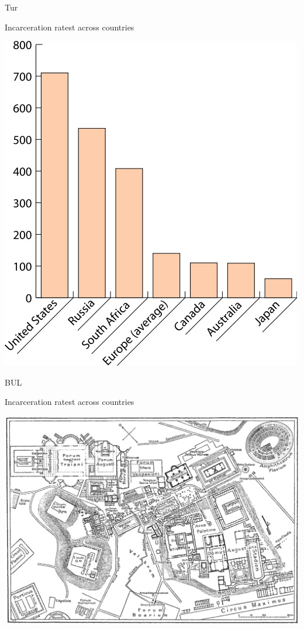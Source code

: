 \begin{chart}{T}{ur}
\caption{Incarceration ratest across countries}
\label{chart:incarceration}
\includegraphics[width=\chartwidth,height=\chartheight]{incarceration}  
\end{chart}

\begin{map}{B}{UL}
\caption{Incarceration ratest across countries}
\label{chart:incarceration}
\includegraphics[width=\chartwidth,height=\chartheight]{Rome}  
\end{map}


